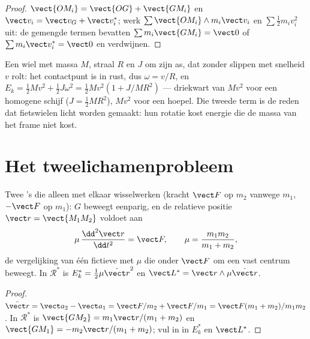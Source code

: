 \begin{proof}
$\vect{OM_i} = \vect{OG} + \vect{GM_i}$ en $\vect v_i = \vect v_G + \vect v_i^*$;
werk $\sum\vect{OM_i}\wedge m_i\vect v_i$ en $\sum\tfrac12 m_iv_i^2$ uit: de gemengde
termen bevatten $\sum m_i\vect{GM_i} = \vect 0$ of $\sum m_i\vect v_i^* = \vect 0$
en verdwijnen.
\end{proof}

\begin{example}\label{ex:b1:systems-of-points:rolling}
Een wiel met massa $M$, straal $R$ en  $J$ om zijn as,
dat zonder slippen met snelheid $v$ rolt: het contactpunt is in rust, dus
$\omega = v/R$, en $E_k = \tfrac12 Mv^2 + \tfrac12 J\omega^2 = \tfrac12 Mv^2(1 +
J/MR^2)$ --- driekwart van $Mv^2$ voor een homogene schijf ($J = \tfrac12 MR^2$),
$Mv^2$ voor een hoepel. Die tweede term is de reden dat fietswielen licht
worden gemaakt: hun rotatie kost energie die de massa van het frame niet kost.
\end{example}

\section{Het tweelichamenprobleem}

\begin{proposition}\label{prop:b1:systems-of-points:twobody}
Twee 's die alleen met elkaar wisselwerken (kracht $\vect F$ op $m_2$
vanwege $m_1$, $-\vect F$ op $m_1$): $G$ beweegt eenparig, en de relatieve
positie $\vect r = \vect{M_1M_2}$ voldoet aan
\[
\mu\,\frac{\dd^2\vect r}{\dd t^2} = \vect F, \qquad \mu = \frac{m_1m_2}{m_1 + m_2},
\]
de vergelijking van één fictieve  met \emph{} $\mu$
die onder $\vect F$ om een vast centrum beweegt. In $\mathcal R^*$ is $E_k^* =
\tfrac12\mu\dot{\vect r}^2$ en $\vect L^* = \vect r\wedge\mu\dot{\vect r}$.
\end{proposition}

\begin{proof}
$\ddot{\vect r} = \vect a_2 - \vect a_1 = \vect F/m_2 + \vect F/m_1 = \vect F(m_1 +
m_2)/m_1m_2$. In $\mathcal R^*$ is $\vect{GM_2} = m_1\vect r/(m_1 + m_2)$ en
$\vect{GM_1} = -m_2\vect r/(m_1 + m_2)$; vul in in $E_k^*$ en $\vect L^*$.
\end{proof}

